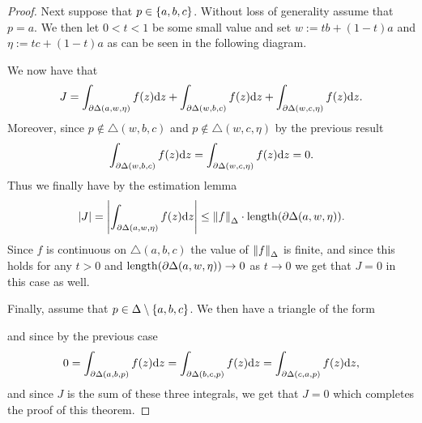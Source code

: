 \documentclass[11pt,a4paper]{article}
\begin{document}
\begin{proof}
  Next suppose that $p \in \left\{a,b,c\right\}$.
  Without loss of generality assume that $p = a$.
  We then let $0 < t < 1$ be some small value and set
  $w := t b + (1 - t) a$ and $\eta := t c + (1 - t) a$
  as can be seen in the following diagram.
  \begin{center}
  \end{center}
  We now have that
  \[
    J =
    \int_{\partial \Delta(a,w,\eta)} f(z) \mathrm{d} z +
    \int_{\partial \Delta(w,b,c)} f(z) \mathrm{d} z +
    \int_{\partial \Delta(w,c,\eta)} f(z) \mathrm{d} z.
  \]
  Moreover, since $p \notin \triangle(w,b,c)$ and
  $p \notin \triangle(w,c,\eta)$ by the previous result
  \[
    \int_{\partial \Delta(w,b,c)} f(z) \mathrm{d} z =
    \int_{\partial \Delta(w,c,\eta)} f(z) \mathrm{d} z = 0.
  \]
  Thus we finally have by the estimation lemma
  \[
    \left\lvert J\right\rvert =
    \left\lvert\int_{\partial \Delta(a,w,\eta)} f(z) \mathrm{d} z\right\rvert \le
    \left\lVert f\right\rVert_{\Delta} \cdot \mathrm{length}(\partial \Delta(a,w,\eta)).
  \]
  Since $f$ is continuous on $\triangle(a,b,c)$ the value of
  $\left\lVert f\right\rVert_{\Delta}$ is finite,
  and since this holds for any $t > 0$ and
  $\mathrm{length}(\partial \Delta(a,w,\eta)) \to 0$ as $t \to 0$
  we get that $J = 0$ in this case as well.

  Finally, assume that $p \in \Delta \setminus \left\{a,b,c\right\}$.
  We then have a triangle of the form
  \begin{center}
  \end{center}
  and since by the previous case
  \[
    0 =
    \int_{\partial \Delta(a,b,p)} f(z) \mathrm{d} z =
    \int_{\partial \Delta(b,c,p)} f(z) \mathrm{d} z =
    \int_{\partial \Delta(c,a,p)} f(z) \mathrm{d} z,
  \]
  and since $J$ is the sum of these three integrals,
  we get that $J = 0$ which completes the proof of this theorem.
\end{proof}
\end{document}
